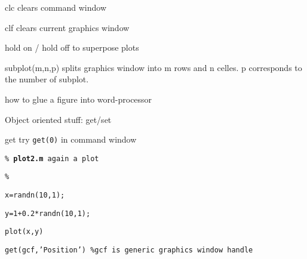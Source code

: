\documentclass[12pt,a4paper]{article}
\begin{document}
clc clears command window

clf clears current graphics window

hold on / hold off to superpose plots

subplot(m,n,p) splits graphics window into m rows and n celles. p
corresponds to the number of subplot.

how to glue a figure into word-processor

\bigskip

Object oriented stuff: get/set

get try \texttt{get(0)} in command window

\bigskip

\texttt{\% \textbf{plot2.m} again a plot}

\texttt{\%}

\texttt{x=randn(10,1);}

\texttt{y=1+0.2*randn(10,1);}

\texttt{plot(x,y)}

\texttt{get(gcf,'Position') \%gcf is generic graphics window handle}
\end{document}
